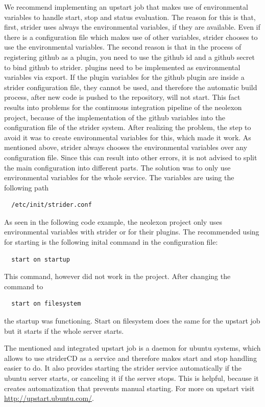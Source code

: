 We recommend implementing an upstart job that makes use of environmental variables to handle start, stop and status evaluation.
The reason for this is that, first, strider uses always the environmental variables, if they are available. Even if there is a configuration
file which makes use of other variables, strider chooses to use the environmental variables. The second reason is that in the process of
registering github as a plugin, you need to use the github id and a github secret to bind github to strider. plugins need to be implemented
as environmental variables via export. If the plugin variables for the github plugin are inside a strider configuration file, they cannot
be used, and therefore the automatic build process, after new code is pushed to the repository, will not start. This fact results into problems
for the continuous integration pipeline of the neolexon project, because of the implementation of the github variables into the configuration
file of the strider system. After realizing the problem, the step to avoid it was to create environmental variables for this, which made it work.
As mentioned above, strider always chooses the environmental variables over any configuration file. Since this can result into other errors,
it is not advised to split the main configuration into different parts. The solution was to only use environmental variables for the whole service.
The variables are using the following path

\begin{lstlisting}
  /etc/init/strider.conf
\end{lstlisting}

As seen in the following code example, the neolexon project only uses environmental variables with strider or for their plugins. The recommended using
for starting is the following inital command in the configuration file:
\begin{lstlisting}
  start on startup
\end{lstlisting}
This command, however did not work in the project. After changing the command to
\begin{lstlisting}
  start on filesystem
\end{lstlisting}
the startup was functioning.
Start on filesystem does the same for the upstart job but it starts if the whole server starts.



The mentioned and integrated upstart job is a daemon for ubuntu systems, which allows to use striderCD as a service and therefore makes start and
stop handling easier to do. It also provides starting the strider service automatically if the ubuntu server starts, or canceling it if the server
stops. This is helpful, because it creates automatization that prevents manual starting. For more on upstart visit \url{http://upstart.ubuntu.com/}.

